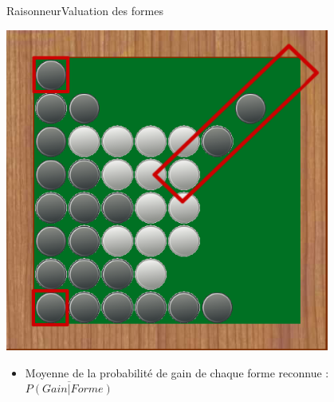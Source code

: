 \begin{frame}{Raisonneur}{Valuation des formes}
	\begin{minipage}{0.45\textwidth}
		\includegraphics[width=0.8\textwidth]{img/screenshoot/raisonneur_choix_2}	
	\end{minipage}
	\begin{minipage}{0.50\textwidth}
		\begin{itemize}
			\item Moyenne de la probabilité de gain de chaque forme reconnue : $\overline{P(Gain|Forme)}$
		\end{itemize}
	\end{minipage}
\end{frame}

